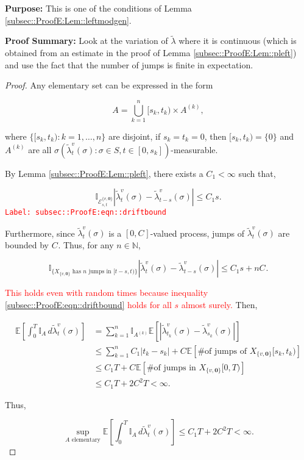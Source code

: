 \documentclass[12pt]{article}
\newcommand{\mb}{\mathbb}
\newcommand{\mc}{\mathcal}
\newcommand{\te}{\text}
\newcommand{\tr}{\textcolor{red}}
\newcommand{\labe}[1]{\tr{\texttt{Label: #1}}}
\newcommand{\purpose}{\textbf{Purpose: }}
\newcommand{\pfsum}{\textbf{Proof Summary: }}
\newcommand{\ex}[1]{\mb{E}\left[#1\right]}			%
\renewcommand{\root}{\mathbf{0}}				%
\renewcommand{\v}{v}							%
\renewcommand{\S}{S}							%
\newcommand{\s}{\sigma}							%
\newcommand{\T}{T}								%
\renewcommand{\t}{t}							%
\renewcommand{\tt}{s}							%
\newcommand{\X}{X}								%
\newcommand{\vind}[1]{^{#1}}					%
\newcommand{\cind}[1]{_{#1}}					%
\newcommand{\tip}[1]{#1}						%
\newcommand{\ts}[1]{_{#1}}						%
\newcommand{\const}{C}							%
\newcommand{\sln}[1]{^{(#1)}}					%
\newcommand{\alt}[1]{\widetilde{#1}}			%
\newcommand{\indx}[1]{_{#1}}					%
\renewcommand{\it}{k}							%
\newcommand{\evnt}{\mc{E}}						%
\newcommand{\typset}{A}							%
\newcommand{\crate}{\alt{\lambda}}				%
\begin{document}
\purpose This is one of the conditions of Lemma \ref{subsec::ProofE:Lem::leftmodgen}.

\pfsum Look at the variation of \(\crate\) where it is continuous (which is obtained from an estimate in the proof of Lemma \ref{subsec::ProofE:Lem::pleft}) and use the fact that the number of jumps is finite in expectation.

\begin{proof}
Any elementary set can be expressed in the form

\[\typset = \bigcup_{\it = 1}^n [\tt\indx{\it},\t\indx{\it})\times \typset\sln{\it},\]

where \(\{[\tt\indx{\it},\t\indx{\it}):\it=1,\dots,n\}\) are disjoint, if \(\tt\indx{\it} = \t\indx{\it} = 0\), then \([\tt\indx{\it},\t\indx{\it}) = \{0\}\) and \(\typset\sln{\it}\) are all \(\sigma(\crate\vind{\v}\ts{\t}(\s):\s \in \S,\t\in [0,\tt\indx{\it}])\)-measurable. 

By Lemma \ref{subsec::ProofE:Lem::pleft}, there exists a \(\const\indx{1} < \infty\) such that,

\begin{equation}
\mb{I}_{\evnt^{\{\v,\root\}}_{\tt,\t}}|\crate\vind{\v}\ts{\t}(\s) - \crate\vind{\v}\ts{\t-\tt}(\s)| \leq \const\indx{1}\tt.
\label{subsec::ProofE:eqn::driftbound}
\end{equation}
\labe{subsec::ProofE:eqn::driftbound}

Furthermore, since \(\crate\vind{\v}\ts{\t}(\s)\) is a \([0,\const\indx{}]\)-valued process, jumps of \(\crate\vind{\v}\ts{\t}(\s)\) are bounded by \(\const\indx{}\). Thus, for any \(n \in \mb{N}\),

\[\mb{I}_{\{\X\cind{\{\v,\root\}}\tip{}\te{ has }n\te{ jumps in } [\t-\tt,\t)\}}|\crate\vind{\v}\ts{\t}(\s) - \crate\vind{\v}\ts{\t-\tt}(\s)|\leq C_1\tt + n \const\indx{}.\]

\tr{This holds even with random times because inequality \eqref{subsec::ProofE:eqn::driftbound} holds for all \(\tt\) almost surely.} Then,

\begin{align*}
\ex{\int_0^\T \mb{I}_\typset\,d\crate\vind{\v}\ts{\t}(\s)} &= \sum_{\it = 1}^n \mb{I}_{\typset\sln{\it}}\ex{\left|\crate\vind{\v}\ts{\t\indx{k}}(\s) - \crate\vind{\v}\ts{\tt\indx{\it}}(\s)\right|}\\
&\leq \sum_{\it=1}^n \const\indx{1}|\t\indx{\it} - \tt\indx{\it}| + \const\indx{}\ex{\te{\# of jumps of }\X\cind{\{\v,\root\}}\tip{[\tt\indx{\it},\t\indx{\it})}}\\
&\leq \const\indx{1}\T + \const\indx{}\ex{\te{\# of jumps in }\X\cind{\{\v,\root\}}\tip{[0,\T)}}\\
&\leq \const\indx{1}\T + 2\const\indx{}^2\T < \infty.
\end{align*}

Thus,

\[\sup_{\typset\te{ elementary}} \ex{\int_0^\T \mb{I}_\typset\,d\crate\vind{\v}\ts{\t}(\s)} \leq \const\indx{1}\T + 2\const\indx{}^2\T < \infty.\]
\end{proof}
\end{document}
